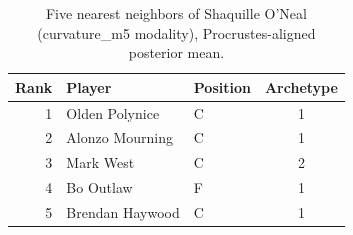 \begin{table}[htbp]
  \centering\small
  \begin{tabular}{rllc}
    \toprule
    Rank & Player & Position & Archetype \\
    \midrule
    1 & Olden Polynice & C & 1 \\
    2 & Alonzo Mourning & C & 1 \\
    3 & Mark West & C & 2 \\
    4 & Bo Outlaw & F & 1 \\
    5 & Brendan Haywood & C & 1 \\
    \bottomrule
  \end{tabular}
  \caption{Five nearest neighbors of Shaquille O'Neal (curvature_m5 modality), Procrustes-aligned posterior mean.}
  \label{tab:Shaquille_O_Neal_neighbors_curvature_m5}
\end{table}

